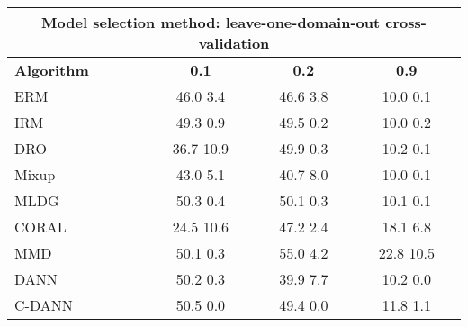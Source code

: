 \documentclass{article}
\begin{document}
\begin{center}
\begin{tabular}{lccc}
\toprule
\multicolumn{4}{c}{\textbf{Model selection method: leave-one-domain-out cross-validation}} \\
\midrule
\textbf{Algorithm}    & \textbf{0.1}              & \textbf{0.2}              & \textbf{0.9}              \\
\midrule
ERM                       & 46.0  3.4            & 46.6  3.8            & 10.0  0.1            \\
IRM                       & 49.3  0.9            & 49.5  0.2            & 10.0  0.2            \\
DRO                 & 36.7  10.9           & 49.9  0.3            & 10.2  0.1            \\
Mixup                     & 43.0  5.1            & 40.7  8.0            & 10.0  0.1            \\
MLDG                      & 50.3  0.4            & 50.1  0.3            & 10.1  0.1            \\
CORAL                     & 24.5  10.6           & 47.2  2.4            & 18.1  6.8            \\
MMD                       & 50.1  0.3            & 55.0  4.2            & 22.8  10.5           \\
DANN                       & 50.2  0.3            & 39.9  7.7            & 10.2  0.0            \\
C-DANN                   & 50.5  0.0            & 49.4  0.0            & 11.8  1.1            \\
\bottomrule
\end{tabular}
\end{center}
\end{document}
